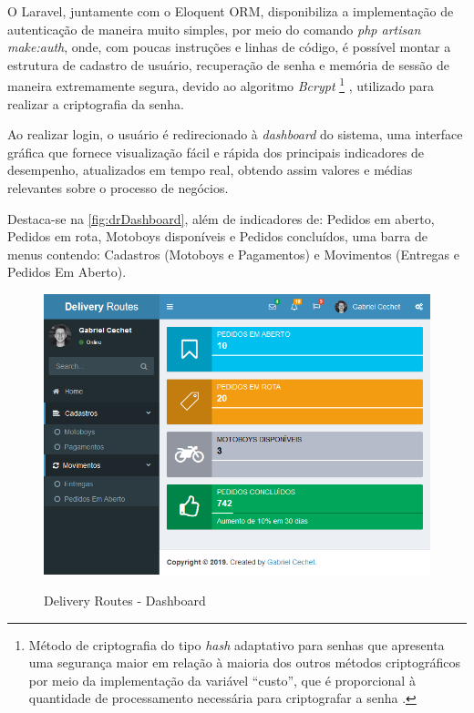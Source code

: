 O Laravel, juntamente com o Eloquent ORM, disponibiliza a implementação de autenticação de maneira muito simples, por meio do comando \textit{php artisan make:auth}, onde, com poucas instruções e linhas de código, é possível montar a estrutura de cadastro de usuário, recuperação de senha e memória de sessão de maneira extremamente segura, devido ao algoritmo \textit{Bcrypt}
\footnote{Método de criptografia do tipo \textit{hash} adaptativo para senhas que apresenta uma segurança maior em relação à maioria dos outros métodos criptográficos por meio da implementação da variável “custo”, que é proporcional à quantidade de processamento necessária para criptografar a senha \cite{bcrypt}.}
, utilizado para realizar a criptografia da senha.

Ao realizar login, o usuário é redirecionado à \textit{dashboard} do sistema, uma interface gráfica que fornece visualização fácil e rápida dos principais indicadores de desempenho, atualizados em tempo real, obtendo assim valores e médias relevantes sobre o processo de negócios. 

Destaca-se na \autoref{fig:drDashboard}, além de indicadores de: Pedidos em aberto, Pedidos em rota, Motoboys disponíveis e Pedidos concluídos, uma barra de menus contendo: Cadastros (Motoboys e Pagamentos) e Movimentos (Entregas e Pedidos Em Aberto).

\begin{figure}[H]
    \centering
    \caption{Delivery Routes - Dashboard}
    \includegraphics[width=1.0\textwidth]{./dados/figuras/fig13}
    \label{fig:drDashboard}
\end{figure}

